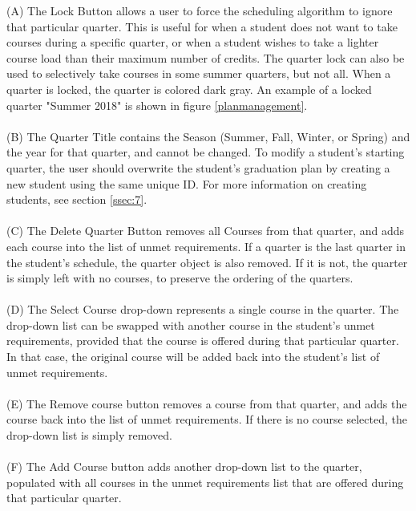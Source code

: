 \documentclass[]{article}
\begin{document}
		\pagebreak 
		(A) The Lock Button allows a user to force the scheduling algorithm to ignore that particular quarter. This is useful for when a student does not want to take courses during a specific quarter, or when a student wishes to take a lighter course load than their maximum number of credits. The quarter lock can also be used to selectively take courses in some summer quarters, but not all. When a quarter is locked, the quarter is colored dark gray. An example of a locked quarter "Summer 2018" is shown in figure \ref{planmanagement}.\\~\\
		
		(B) The Quarter Title contains the Season (Summer, Fall, Winter, or Spring) and the year for that quarter, and cannot be changed. To modify a student's starting quarter, the user should overwrite the student's graduation plan by creating a new student using the same unique ID. For more information on creating students, see section \ref{ssec:7}.\\~\\
		
		(C) The Delete Quarter Button removes all Courses from that quarter, and adds each course into the list of unmet requirements. If a quarter is the last quarter in the student's schedule, the quarter object is also removed. If it is not, the quarter is simply left with no courses, to preserve the ordering of the quarters. \\~\\
		
		(D) The Select Course drop-down represents a single course in the quarter. The drop-down list can be swapped with another course in the student's unmet requirements, provided that the course is offered during that particular quarter. In that case, the original course will be added back into the student's list of unmet requirements.\\~\\
		
		(E) The Remove course button removes a course from that quarter, and adds the course back into the list of unmet requirements. If there is no course selected, the drop-down list is simply removed.\\~\\
		
		(F) The Add Course button adds another drop-down list to the quarter, populated with all courses in the unmet requirements list that are offered during that particular quarter. \\~\\
		
\end{document}
